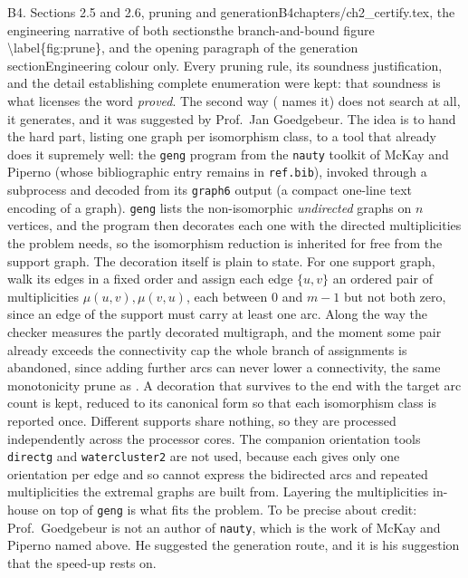 \begin{offcutrewrite}{B4. Sections 2.5 and 2.6, pruning and generation}{B4}{chapters/ch2\_certify.tex, the engineering narrative of both sections}{the branch-and-bound figure \textbackslash{}label\{fig:prune\}, and the opening paragraph of the generation section}{Engineering colour only. Every pruning rule, its soundness justification, and the detail establishing complete enumeration were kept: that soundness is what licenses the word \emph{proved}.}
The second way ( names it) does not search at all, it generates, and it was suggested by Prof.\ Jan Goedgebeur. The idea is to hand the hard part, listing one graph per isomorphism class, to a tool that already does it supremely well: the \texttt{geng} program from the \texttt{nauty} toolkit of McKay and Piperno (whose bibliographic entry remains in \texttt{ref.bib}), invoked through a subprocess and decoded from its \texttt{graph6} output (a compact one-line text encoding of a graph). \texttt{geng} lists the non-isomorphic \emph{undirected} graphs on $n$ vertices, and the program then decorates each one with the directed multiplicities the problem needs, so the isomorphism reduction is inherited for free from the support graph. The decoration itself is plain to state. For one support graph, walk its edges in a fixed order and assign each edge $\{u,v\}$ an ordered pair of multiplicities $\mu(u,v), \mu(v,u)$, each between $0$ and $m-1$ but not both zero, since an edge of the support must carry at least one arc. Along the way the checker measures the partly decorated multigraph, and the moment some pair already exceeds the connectivity cap the whole branch of assignments is abandoned, since adding further arcs can never lower a connectivity, the same monotonicity prune as . A decoration that survives to the end with the target arc count is kept, reduced to its canonical form so that each isomorphism class is reported once. Different supports share nothing, so they are processed independently across the processor cores. The companion orientation tools \texttt{directg} and \texttt{watercluster2} are not used, because each gives only one orientation per edge and so cannot express the bidirected arcs and repeated multiplicities the extremal graphs are built from. Layering the multiplicities in-house on top of \texttt{geng} is what fits the problem. To be precise about credit: Prof.\ Goedgebeur is not an author of \texttt{nauty}, which is the work of McKay and Piperno named above. He suggested the generation route, and it is his suggestion that the speed-up rests on.
\nowreads

\end{offcutrewrite}
